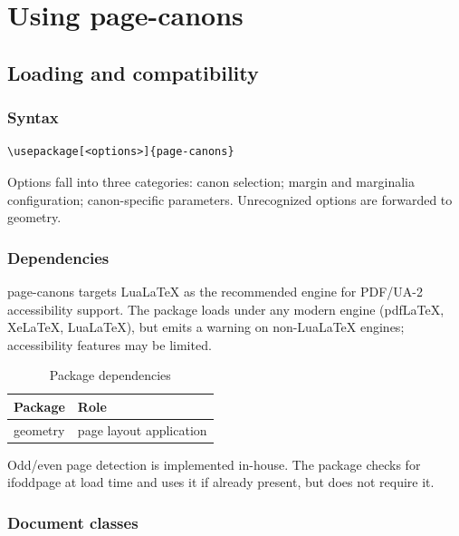 \documentclass[11pt, twoside, openany]{book}
\newcommand{\pkg}[1]{\textsf{#1}}
\begin{document}
\part{Using page-canons}\label{part:using}


\chapter{Loading and compatibility}\label{chapter:loading}

\section{Syntax}\label{sec:syntax}

\begin{verbatim}
\usepackage[<options>]{page-canons}
\end{verbatim}

Options fall into three categories: canon selection; margin and marginalia configuration; canon-specific parameters. Unrecognized options are forwarded to \pkg{geometry}.

\section{Dependencies}\label{sec:dependencies}

\pkg{page-canons} targets Lua\LaTeX{} as the recommended engine for PDF/UA-2 accessibility support. The package loads under any modern engine (pdf\LaTeX, Xe\LaTeX, Lua\LaTeX), but emits a warning on non-Lua\LaTeX{} engines; accessibility features may be limited.

\begin{table}
    \centering
    \caption{Package dependencies}
    \label{tab:packagedependencies}
	\begin{tabular}{ll}
		\textbf{Package} & \textbf{Role}           \\
		\hline
		\pkg{geometry}   & page layout application \\
	\end{tabular}
\end{table}

Odd/even page detection is implemented in-house. The package checks for \pkg{ifoddpage} at load time and uses it if already present, but does not require it.

\section{Document classes}\label{sec:classes}
\end{document}
